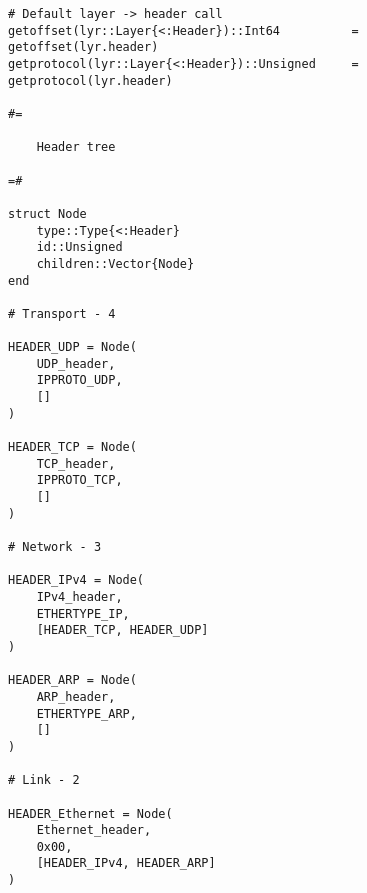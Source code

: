 \begin{lstlisting}[language=JuliaLocal, style=julia]
# Default layer -> header call
getoffset(lyr::Layer{<:Header})::Int64          = getoffset(lyr.header)
getprotocol(lyr::Layer{<:Header})::Unsigned     = getprotocol(lyr.header)

#=

    Header tree

=#

struct Node
    type::Type{<:Header}
    id::Unsigned
    children::Vector{Node}
end

# Transport - 4

HEADER_UDP = Node(
    UDP_header,
    IPPROTO_UDP,
    []
)

HEADER_TCP = Node(
    TCP_header,
    IPPROTO_TCP,
    []
)

# Network - 3

HEADER_IPv4 = Node(
    IPv4_header,
    ETHERTYPE_IP,
    [HEADER_TCP, HEADER_UDP]
)

HEADER_ARP = Node(
    ARP_header,
    ETHERTYPE_ARP,
    []
)

# Link - 2

HEADER_Ethernet = Node(
    Ethernet_header,
    0x00,
    [HEADER_IPv4, HEADER_ARP]
)

\end{lstlisting}
